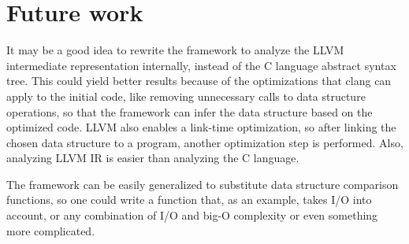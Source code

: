 \documentclass[a4paper,11pt]{article}
\begin{document}
\section{Future work} \label{sec:future}
	It may be a good idea to rewrite the framework to analyze the LLVM\cite{LLVM} intermediate representation internally,
    instead of the C language abstract syntax tree. This could yield better results because of the optimizations that clang
    \cite{Clang} can apply to
	the initial code, like removing unnecessary calls to data structure operations, so that the framework can infer the
	data structure based on the optimized code. LLVM also enables a link-time optimization, so after linking the
	chosen data structure to a program, another optimization step is performed. Also, analyzing LLVM IR is easier
	than analyzing the C language.

    The framework can be easily generalized to substitute data structure comparison functions, so one could write a function
    that, as an example, takes I/O into account, or any combination of I/O and big-O complexity or even something more complicated.
\end{document}
